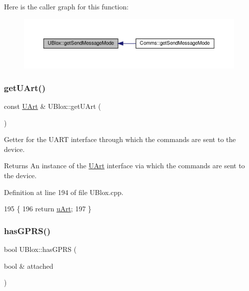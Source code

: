 Here is the caller graph for this function\+:
\nopagebreak
\begin{figure}[H]
\begin{center}
\leavevmode
\includegraphics[width=350pt]{da/df6/class_u_blox_aee30d82dcf52335d19f77e766db78ab4_icgraph}
\end{center}
\end{figure}
\mbox{\label{class_u_blox_a8c5180db80a49a194bab2baa7fb74bb2}} 
\subsubsection{\texorpdfstring{get\+U\+Art()}{getUArt()}}
{\footnotesize\ttfamily const \hyperlink{class_u_art}{U\+Art} \& U\+Blox\+::get\+U\+Art (\begin{DoxyParamCaption}{ }\end{DoxyParamCaption})}

Getter for the U\+A\+RT interface through which the commands are sent to the device.

\begin{DoxyReturn}{Returns}
An instance of the \hyperlink{class_u_art}{U\+Art} interface via which the commands are sent to the device. 
\end{DoxyReturn}


Definition at line 194 of file U\+Blox.\+cpp.


\begin{DoxyCode}
195 \{
196     \textcolor{keywordflow}{return} \hyperlink{class_u_blox_a034c0463d1c199d094d657c8ebb151e8}{uArt};
197 \}
\end{DoxyCode}
\mbox{\label{class_u_blox_a4f5a31b4ddda664b255ce3f63e9ffac7}} 
\subsubsection{\texorpdfstring{has\+G\+P\+R\+S()}{hasGPRS()}}
{\footnotesize\ttfamily bool U\+Blox\+::has\+G\+P\+RS (\begin{DoxyParamCaption}\item[{bool \&}]{attached }\end{DoxyParamCaption})}

